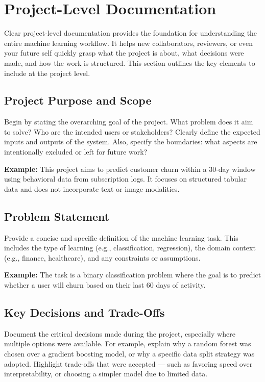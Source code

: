 \documentclass[12pt,openany]{book}
\begin{document}
\section{Project-Level Documentation}

Clear project-level documentation provides the foundation for understanding the entire machine learning workflow. It helps new collaborators, reviewers, or even your future self quickly grasp what the project is about, what decisions were made, and how the work is structured. This section outlines the key elements to include at the project level.

\subsection{Project Purpose and Scope}

Begin by stating the overarching goal of the project. What problem does it aim to solve? Who are the intended users or stakeholders? Clearly define the expected inputs and outputs of the system. Also, specify the boundaries: what aspects are intentionally excluded or left for future work?

\textbf{Example:} This project aims to predict customer churn within a 30-day window using behavioral data from subscription logs. It focuses on structured tabular data and does not incorporate text or image modalities.

\subsection{Problem Statement}

Provide a concise and specific definition of the machine learning task. This includes the type of learning (e.g., classification, regression), the domain context (e.g., finance, healthcare), and any constraints or assumptions.

\textbf{Example:} The task is a binary classification problem where the goal is to predict whether a user will churn based on their last 60 days of activity.

\subsection{Key Decisions and Trade-Offs}

Document the critical decisions made during the project, especially where multiple options were available. For example, explain why a random forest was chosen over a gradient boosting model, or why a specific data split strategy was adopted. Highlight trade-offs that were accepted — such as favoring speed over interpretability, or choosing a simpler model due to limited data.
\end{document}
